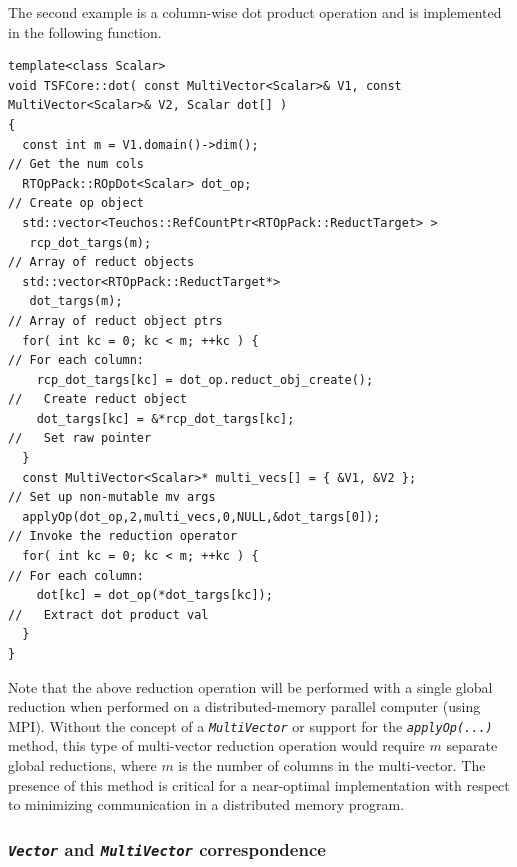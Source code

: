 The second example is a column-wise dot product operation and is
implemented in the following function.

{\scriptsize\begin{verbatim}
template<class Scalar>
void TSFCore::dot( const MultiVector<Scalar>& V1, const MultiVector<Scalar>& V2, Scalar dot[] )
{
  const int m = V1.domain()->dim();                                      // Get the num cols
  RTOpPack::ROpDot<Scalar> dot_op;                                       // Create op object
  std::vector<Teuchos::RefCountPtr<RTOpPack::ReductTarget> >
   rcp_dot_targs(m);                                                     // Array of reduct objects
  std::vector<RTOpPack::ReductTarget*>
   dot_targs(m);                                                         // Array of reduct object ptrs
  for( int kc = 0; kc < m; ++kc ) {                                      // For each column:
    rcp_dot_targs[kc] = dot_op.reduct_obj_create();                      //   Create reduct object
    dot_targs[kc] = &*rcp_dot_targs[kc];                                 //   Set raw pointer
  }
  const MultiVector<Scalar>* multi_vecs[] = { &V1, &V2 };                // Set up non-mutable mv args
  applyOp(dot_op,2,multi_vecs,0,NULL,&dot_targs[0]);                     // Invoke the reduction operator
  for( int kc = 0; kc < m; ++kc ) {                                      // For each column:
    dot[kc] = dot_op(*dot_targs[kc]);                                    //   Extract dot product val
  }
}
\end{verbatim}}

{}\noindent{}Note that the above reduction operation will be performed
with a single global reduction when performed on a distributed-memory
parallel computer (using MPI).  Without the concept of a
{}\texttt{\textit{Multi\-Vector}} or support for the
{}\texttt{\textit{applyOp(\-...)}} method, this type of multi-vector
reduction operation would require $m$ separate global reductions,
where $m$ is the number of columns in the multi-vector.  The presence
of this method is critical for a near-optimal implementation with
respect to minimizing communication in a distributed memory program.

%
\subsubsection{\texttt{\textit{Vector}} and {}\texttt{\textit{Multi\-Vector}} correspondence}
\label{tsfcore:sec:vector_vs_multivector}
%

